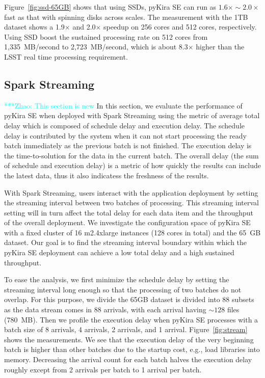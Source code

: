 \documentclass[10pt,journal,compsoc]{IEEEtran}
\newcommand{\zhaonote}[1]{{\textcolor{cyan}    { ***Zhao:      #1 }}}
\newcommand{\zhaonote}[1]{}
\begin{document}
Figure~\ref{fig:ssd-65GB} shows that using SSDs, pyKira SE can run as $1.6\times\sim2.0\times$ fast as that with spinning disks across scales.
The measurement with the 1TB dataset  shows a 1.9$\times$ and 2.0$\times$ speedup on 256 cores and 512 cores, respectively.
Using SSD boost the sustained processing rate on 512 cores from 1,335~MB/second to 2,723~MB/second, which is about 8.3$\times$ higher
than the LSST real time processing requirement.

\subsection{Spark Streaming}
\zhaonote{This section is new}
In this section, we evaluate the performance of pyKira SE when deployed with Spark Streaming using the metric of average total delay 
which is composed of schedule delay and execution delay.
The schedule delay is contributed by the system when it can not start processing the ready batch immediately as the previous batch is not finished.
The execution delay is the time-to-solution for the data in the current batch.
The overall delay (the sum of schedule and execution delay) is a metric of how quickly the results can include the latest data, 
thus it also indicatess the freshness of the results.

With Spark Streaming, users interact with the application deployment by setting the streaming interval between two batches of processing.
This streaming interval setting will in turn affect the total delay for each data item and the throughput of the overall deployment.
We investigate the configuration space of pyKira SE with a fixed cluster of 16 m2.4xlarge instances (128 cores in total) and 
the 65~GB dataset. 
Our goal is to find the streaming interval boundary within which the pyKira SE deployment can achieve a low total delay and a
high sustained throughput.

To ease the analysis, we first minimize the schedule delay by setting the streaming interval long enough so that the processing of two batches
do not overlap.
For this purpose, we divide the 65GB dataset is divided into 88 subsets as the data stream comes in 88 arrivals, 
with each arrival having $\sim128$ files (780~MB).
Then we profile the execution delay when pyKira SE processes with a batch size of 8 arrivals, 4 arrivals, 2 arrivals, and 1 arrival.
Figure~\ref{fig:stream} shows the measurements.
We see that the execution delay of the very beginning batch is higher than other batches due to the startup cost, e.g., load libraries into memory.
Decreasing the arrival count for each batch halves the execution delay roughly except from 2 arrivals per batch to 1 arrival per batch.
\end{document}
